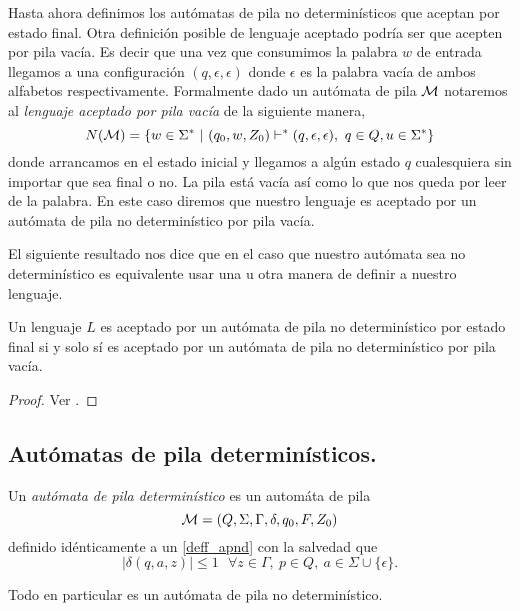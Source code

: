 \documentclass[tesis.tex]{subfiles}
\begin{document}
Hasta ahora definimos los autómatas de pila no determinísticos que aceptan por estado final. Otra definición posible de lenguaje aceptado podría ser que acepten por pila vacía. 
Es decir que una vez que consumimos la palabra $w$ de entrada llegamos a una configuración $(q, \epsilon, \epsilon)$ donde $\epsilon$ es la palabra vacía de ambos alfabetos respectivamente. Formalmente dado un autómata de pila $\cal M$  notaremos al \emph{lenguaje aceptado por pila vacía} de la siguiente manera,
\begin{equation*}
	N({\cal M}) = \{ w \in \Sigma^* \ | \ (q_0,w,Z_0) \vdash^* (q, \epsilon, \epsilon), \ q \in Q, u \in \Sigma^*    \}
\end{equation*}
donde arrancamos en el estado inicial y llegamos a algún estado $q$ cualesquiera sin importar que sea final o no.
La pila está vacía así como lo que nos queda por leer de la palabra. 
En este caso diremos que nuestro lenguaje es aceptado por un autómata de pila no determinístico por pila vacía.


El siguiente resultado nos dice que en el caso que nuestro autómata sea no determinístico es equivalente usar una u otra manera de definir a nuestro lenguaje.

\medskip
\begin{teo}
	Un lenguaje $L$ es aceptado por un autómata de pila no determinístico por estado final si y solo sí es aceptado por un autómata de pila no determinístico por pila vacía.
\end{teo}

\begin{proof}
	Ver \cite{hopcraft-ullman}.
\end{proof}

\subsection{Autómatas de pila determinísticos.} 
\begin{deff}
	Un \emph{autómata de pila determinístico} es un automáta de pila 
	\[
	{\cal M } = (Q, \Sigma, \Gamma, \delta, q_0, F, Z_0)
	\]
	definido idénticamente a un \APND \ref{deff_apnd} con la salvedad que 
	\[
	|\delta(q,a, z)| \le 1 \ \ \ \forall z \in \Gamma, \ p \in Q, \ a \in \Sigma \cup \{ \epsilon \}.
	\]
\end{deff}

\begin{obs}
	Todo \APD en particular es un autómata de pila no determinístico. 
\end{obs}
\end{document}
